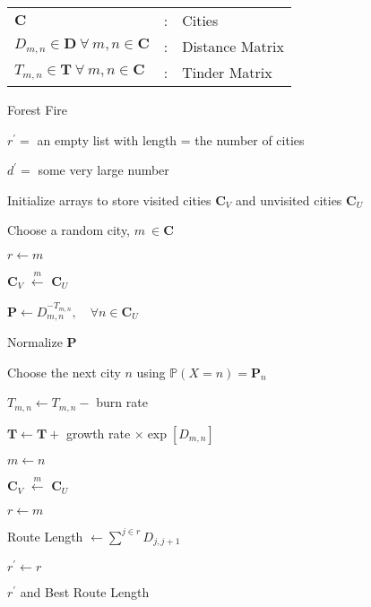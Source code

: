 \documentclass{minimal}
\begin{document}
	
\begin{tabular}{ p{4cm} p{0.5cm} l }
	\(\mathbf{C}\) &:& Cities \\
	\({D_{m,n}} \in \mathbf{D}\ \forall\ m,n \in \mathbf{C}\) &:& Distance Matrix \\
	\({T_{m,n}} \in \mathbf{T}\ \forall\ m,n \in \mathbf{C}\) &:& Tinder Matrix \\
\end{tabular}
	
\begin{algorithm}
\caption{Forest Fire}
\label{alg:forest_fire}
\begin{algorithmic}
	
	
	\(r^\prime = \) an empty list with length = the number of cities 
	
	\(d^\prime = \) some very large number
	
	
		Initialize arrays to store visited cities \(\mathbf{C}_V\) and unvisited cities \(\mathbf{C}_U\)
		
		Choose a random city, \(m \ \in \mathbf{C}\)
		
		\(r \gets m\)
		
		\(\mathbf{C}_V\) \(\overset{m}{\leftarrow}\) \(\mathbf{C}_U\)
		
			\State \(\mathbf P\gets  D_{m,n}^{-T_{m,n}}, \quad\forall n \in\mathbf{C}_U\)
			
			\State Normalize \(\mathbf{P}\)
			
			\State Choose the next city \(n\) using \( \mathbb P(X=n) = \mathbf{P}_n \)

			\State \(T_{m,n} \gets T_{m,n} - \) burn rate
			
			\State \(\mathbf{T} \gets \mathbf{T} + \) growth rate \(\times \exp[D_{m,n}]\)
			
			\State \(m \gets n\)
			
			\State \(\mathbf{C}_V\) \(\overset{m}{\leftarrow}\) \(\mathbf{C}_U\)
			
			\State \(r \gets m\)
		\EndWhile
		
		\State Route Length \(\gets \sum_{}^{j\in r} D_{j,j+1} \)
		
			\State \(r^\prime \gets r\)
		\EndIf
		
		\Return \(r^\prime\) and Best Route Length

	\EndFor
	\EndProcedure
\end{algorithmic}
\end{algorithm}
\end{document}
